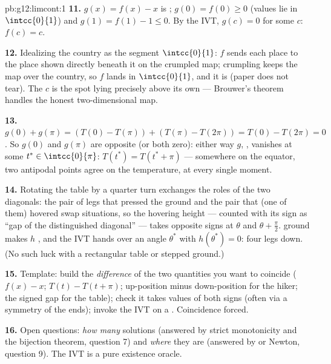 \begin{solution}{pb:g12:limcont:1}
\textbf{11.} $g(x) = f(x) - x$ is ;
$g(0) = f(0) \geq 0$ (values lie in $\intcc{0}{1}$) and
$g(1) = f(1) - 1 \leq 0$. By the IVT, $g(c) = 0$ for some $c$:
$f(c) = c$.

\textbf{12.} Idealizing the country as the segment
$\intcc{0}{1}$: $f$ sends each place to the place shown
directly beneath it on the crumpled map; crumpling keeps the
map over the country, so $f$ lands in $\intcc{0}{1}$, and it
is  (paper does not tear). The  $c$ is
the spot lying precisely above its own  --- Brouwer's
theorem handles the honest two-dimensional map.

\textbf{13.} $g(0) + g(\pi) = \left(T(0) - T(\pi)\right) +
\left(T(\pi) - T(2\pi)\right) = T(0) - T(2\pi) = 0$. So
$g(0)$ and $g(\pi)$ are opposite (or both zero): either way
$g$, , vanishes at some $t^* \in \intcc{0}{\pi}$:
$T(t^*) = T(t^* + \pi)$ --- somewhere on the equator, two
antipodal points agree on the temperature, at every single
moment.

\textbf{14.} Rotating the table by a quarter turn exchanges
the roles of the two diagonals: the pair of legs that pressed
the ground and the pair that (one of them) hovered swap
situations, so the hovering height --- counted with its sign
as ``gap of the distinguished diagonal'' --- takes opposite
signs at $\theta$ and $\theta + \frac\pi2$.  ground
makes $h$ , and the IVT hands over an angle
$\theta^*$ with $h(\theta^*) = 0$: four legs down. (No such
luck with a rectangular table or stepped ground.)

\textbf{15.} Template: build the \emph{difference} of the two
quantities you want to coincide ($f(x) - x$;
$T(t) - T(t + \pi)$; up-position minus down-position for the
hiker; the signed gap for the table); check it takes values of
both signs (often via a symmetry of the ends); invoke the IVT
on a  . Coincidence forced.

\textbf{16.} Open questions: \emph{how many} solutions
(answered by strict monotonicity and the bijection theorem,
question 7) and \emph{where} they are (answered by 
or Newton, question 9). The IVT is a pure existence oracle.


\end{solution}
